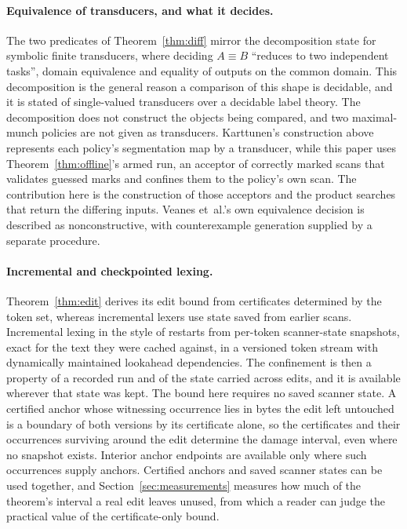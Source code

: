 \documentclass[11pt,a4paper]{article}
\theoremstyle{definition}
\theoremstyle{plain}
\begin{document}
\paragraph{Equivalence of transducers, and what it decides.} The two predicates of Theorem~\ref{thm:diff} mirror the
decomposition \citet{veanes2012sft} state for symbolic finite transducers, where deciding $A \equiv B$ ``reduces to two
independent tasks'', domain equivalence and equality of outputs on the common domain. This decomposition is the general
reason a comparison of this shape is decidable, and it is stated of single-valued transducers over a decidable label
theory. The decomposition does not construct the objects being compared, and two maximal-munch policies are not given as
transducers. Karttunen's construction above represents each policy's segmentation map by a transducer, while this paper
uses Theorem~\ref{thm:offline}'s armed run, an acceptor of correctly marked scans that validates guessed marks and
confines them to the policy's own scan. The contribution here is the construction of those acceptors and the product
searches that return the differing inputs. Veanes et~al.'s own equivalence decision is described as nonconstructive,
with counterexample generation supplied by a separate procedure.

\paragraph{Incremental and checkpointed lexing.} Theorem~\ref{thm:edit} derives its edit bound from certificates
determined by the token set, whereas incremental lexers use state saved from earlier scans. Incremental lexing in the
style of \citet{wagner1997lexing} restarts from per-token scanner-state snapshots, exact for the text they were cached
against, in a versioned token stream with dynamically maintained lookahead dependencies. The confinement is then a
property of a recorded run and of the state carried across edits, and it is available wherever that state was kept. The
bound here requires no saved scanner state. A certified anchor whose witnessing occurrence lies in bytes the edit left
untouched is a boundary of both versions by its certificate alone, so the certificates and their occurrences surviving
around the edit determine the damage interval, even where no snapshot exists. Interior anchor endpoints are available
only where such occurrences supply anchors. Certified anchors and saved scanner states can be used together, and
Section~\ref{sec:measurements} measures how much of the theorem's interval a real edit leaves unused, from which a
reader can judge the practical value of the certificate-only bound.
\end{document}
